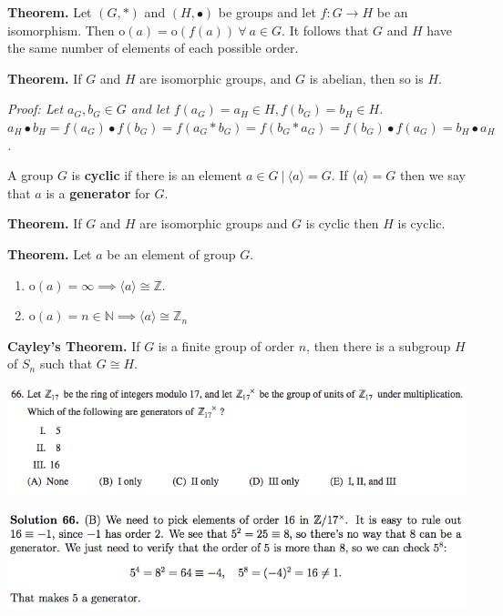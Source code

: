 \documentclass{article}
\begin{document}
\textbf{Theorem.} Let \((G, *)\) and \((H, \bullet)\) be groups and let \(f:G \to H\) be an isomorphism. Then \(\text{o}(a) = \text{o}(f(a)) \ \forall \ a \in G\). It follows that \(G\) and \(H\) have the same number of elements of each possible order.

\textbf{Theorem.} If \(G\) and \(H\) are isomorphic groups, and \(G\) is abelian, then so is \(H\).

\begin{center}
\textit{Proof: Let \(a_G, b_G \in G\) and let \(f(a_G) = a_H \in H, f(b_G) = b_H \in H\). \(a_H \bullet b_H = f(a_G) \bullet f(b_G) = f(a_G * b_G) = f(b_G * a_G) = f(b_G) \bullet f(a_G) = b_H \bullet a_H\).}
\end{center}

A group \(G\) is \textbf{cyclic} if there is an element \(a \in G \ | \ \langle a \rangle = G\). If \(\langle a \rangle = G\) then we say that \(a\) is a \textbf{generator} for \(G\). 

\textbf{Theorem.} If \(G\) and \(H\) are isomorphic groups and \(G\) is cyclic then \(H\) is cyclic.

\textbf{Theorem.} Let \(a\) be an element of group \(G\). 

\begin{enumerate}[1.]

\item \(\text{o}(a) = \infty \implies \langle a \rangle \cong \mathbb{Z}\).

\item \(\text{o}(a) = n \in \mathbb{N} \implies \langle a \rangle \cong \mathbb{Z}_n\)

\end{enumerate}



\textbf{Cayley's Theorem.} If \(G\) is a finite group of order \(n\), then there is a subgroup \(H\) of \(S_n\) such that \(G \cong H\).

\includegraphics[scale=0.65]{1268_66}

\includegraphics[scale=0.65]{1268_66s}
\end{document}
